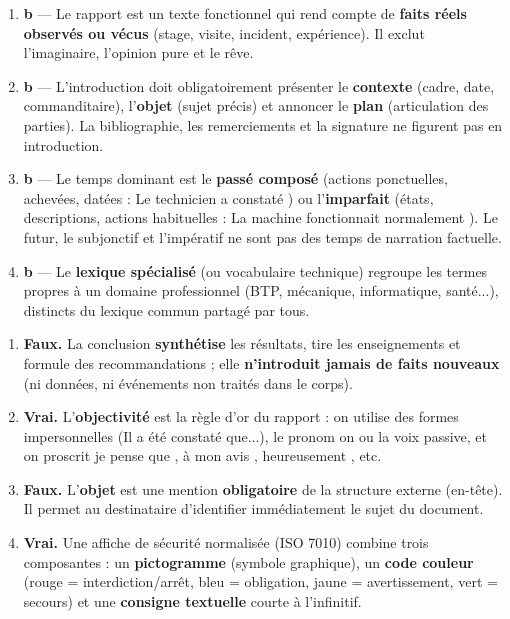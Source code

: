 \documentclass[11pt]{article}
\newcounter{popsec}
\newcounter{popsub}
\newcommand{\courssub}[1]{%
  \stepcounter{popsub}%
  \par\vspace{9pt}\noindent{\popxbold\fontsize{11.5}{13}\selectfont\color{popink}{\color{poporange}\thepopsec.\thepopsub}\hspace{6pt}#1}\par\nopagebreak\vspace{4pt}
}
\begin{document}

\courssub{Je vérifie mes connaissances}

\begin{corrige}
\begin{enumerate}
\item \textbf{b} — Le rapport est un texte fonctionnel qui rend compte de \textbf{faits réels observés ou vécus} (stage, visite, incident, expérience). Il exclut l'imaginaire, l'opinion pure et le rêve.
\item \textbf{b} — L'introduction doit obligatoirement présenter le \textbf{contexte} (cadre, date, commanditaire), l'\textbf{objet} (sujet précis) et annoncer le \textbf{plan} (articulation des parties). La bibliographie, les remerciements et la signature ne figurent pas en introduction.
\item \textbf{b} — Le temps dominant est le \textbf{passé composé} (actions ponctuelles, achevées, datées : \og Le technicien a constaté \fg) ou l'\textbf{imparfait} (états, descriptions, actions habituelles : \og La machine fonctionnait normalement \fg). Le futur, le subjonctif et l'impératif ne sont pas des temps de narration factuelle.
\item \textbf{b} — Le \textbf{lexique spécialisé} (ou vocabulaire technique) regroupe les termes propres à un domaine professionnel (BTP, mécanique, informatique, santé...), distincts du lexique commun partagé par tous.
\end{enumerate}
\end{corrige}

\begin{corrige}
\begin{enumerate}
\item \textbf{Faux.} La conclusion \textbf{synthétise} les résultats, tire les enseignements et formule des recommandations ; elle \textbf{n'introduit jamais de faits nouveaux} (ni données, ni événements non traités dans le corps).
\item \textbf{Vrai.} L'\textbf{objectivité} est la règle d'or du rapport : on utilise des formes impersonnelles (\og Il a été constaté que...\fg), le pronom \og on \fg ou la voix passive, et on proscrit \og je pense que \fg, \og à mon avis \fg, \og heureusement \fg, etc.
\item \textbf{Faux.} L'\textbf{objet} est une mention \textbf{obligatoire} de la structure externe (en-tête). Il permet au destinataire d'identifier immédiatement le sujet du document.
\item \textbf{Vrai.} Une affiche de sécurité normalisée (ISO 7010) combine trois composantes : un \textbf{pictogramme} (symbole graphique), un \textbf{code couleur} (rouge = interdiction/arrêt, bleu = obligation, jaune = avertissement, vert = secours) et une \textbf{consigne textuelle} courte à l'infinitif.
\end{enumerate}
\end{corrige}
\end{document}

